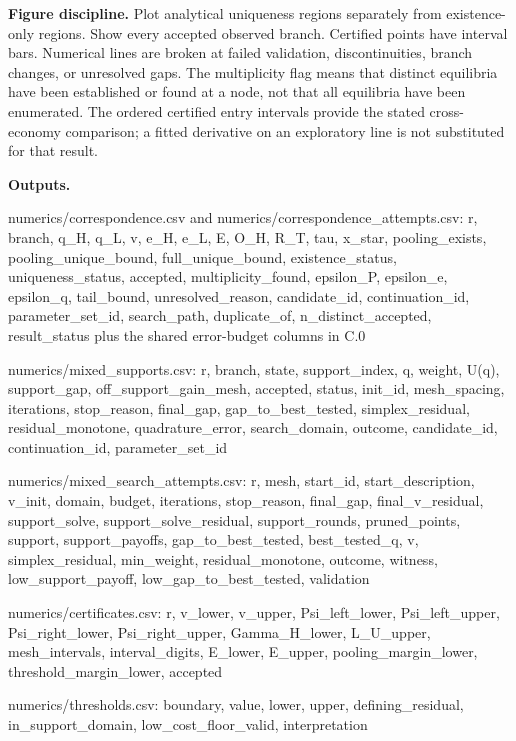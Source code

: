 \documentclass[
  11pt,
]{article}
\newenvironment{Shaded}{}{}
\newcommand{\NormalTok}[1]{#1}
\begin{document}
\textbf{Figure discipline.} Plot analytical uniqueness regions
separately from existence-only regions. Show every accepted observed
branch. Certified points have interval bars. Numerical lines are broken
at failed validation, discontinuities, branch changes, or unresolved
gaps. The multiplicity flag means that distinct equilibria have been
established or found at a node, not that all equilibria have been
enumerated. The ordered certified entry intervals provide the stated
cross-economy comparison; a fitted derivative on an exploratory line is
not substituted for that result.

\textbf{Outputs.}

\begin{Shaded}
\begin{Highlighting}[]
\NormalTok{numerics/correspondence.csv and numerics/correspondence\_attempts.csv:}
\NormalTok{r, branch, q\_H, q\_L, v, e\_H, e\_L, E, O\_H, R\_T, tau, x\_star, pooling\_exists,}
\NormalTok{pooling\_unique\_bound, full\_unique\_bound, existence\_status, uniqueness\_status, accepted,}
\NormalTok{multiplicity\_found, epsilon\_P, epsilon\_e, epsilon\_q, tail\_bound, unresolved\_reason,}
\NormalTok{candidate\_id, continuation\_id, parameter\_set\_id, search\_path, duplicate\_of,}
\NormalTok{n\_distinct\_accepted, result\_status}
\NormalTok{plus the shared error{-}budget columns in C.0}

\NormalTok{numerics/mixed\_supports.csv:}
\NormalTok{r, branch, state, support\_index, q, weight, U(q), support\_gap, off\_support\_gain\_mesh,}
\NormalTok{accepted, status, init\_id, mesh\_spacing, iterations, stop\_reason, final\_gap,}
\NormalTok{gap\_to\_best\_tested, simplex\_residual, residual\_monotone, quadrature\_error,}
\NormalTok{search\_domain, outcome, candidate\_id, continuation\_id, parameter\_set\_id}

\NormalTok{numerics/mixed\_search\_attempts.csv:}
\NormalTok{r, mesh, start\_id, start\_description, v\_init, domain, budget, iterations, stop\_reason,}
\NormalTok{final\_gap, final\_v\_residual, support\_solve, support\_solve\_residual, support\_rounds,}
\NormalTok{pruned\_points, support, support\_payoffs, gap\_to\_best\_tested, best\_tested\_q, v,}
\NormalTok{simplex\_residual, min\_weight, residual\_monotone, outcome, witness, low\_support\_payoff,}
\NormalTok{low\_gap\_to\_best\_tested, validation}

\NormalTok{numerics/certificates.csv:}
\NormalTok{r, v\_lower, v\_upper, Psi\_left\_lower, Psi\_left\_upper,}
\NormalTok{Psi\_right\_lower, Psi\_right\_upper, Gamma\_H\_lower,}
\NormalTok{L\_U\_upper, mesh\_intervals, interval\_digits,}
\NormalTok{E\_lower, E\_upper, pooling\_margin\_lower, threshold\_margin\_lower, accepted}

\NormalTok{numerics/thresholds.csv:}
\NormalTok{boundary, value, lower, upper, defining\_residual,}
\NormalTok{in\_support\_domain, low\_cost\_floor\_valid, interpretation}
\end{Highlighting}
\end{Shaded}
\end{document}
